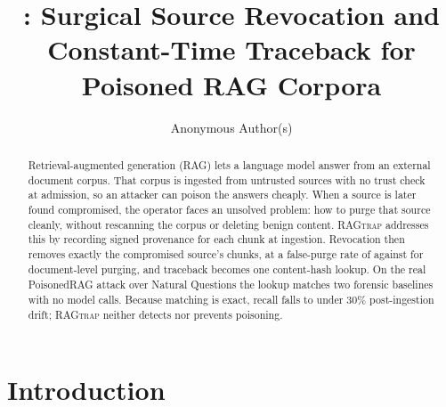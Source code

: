 \documentclass[12pt]{article}
\title{\sysname{}: Surgical Source Revocation and\\
Constant-Time Traceback for Poisoned RAG Corpora}
\author{Anonymous Author(s)\inst{1}}
\newcommand{\sysname}{\textsc{RAGtrap}\xspace}
\begin{document}
\maketitle

\begin{abstract}
Retrieval-augmented generation (RAG) lets a language model answer from an
external document corpus. That corpus is ingested from untrusted sources with no
trust check at admission, so an attacker can poison the answers cheaply. When a
source is later found compromised, the operator faces an unsolved problem: how to
purge that source cleanly, without rescanning the corpus or deleting benign
content. \sysname{} addresses this by recording signed provenance for each chunk at
ingestion. Revocation then removes exactly the compromised source's chunks, at a
false-purge rate of \textbf{\PerChunkFP{}} against \textbf{\PerDocFP{}} for
document-level purging, and traceback becomes one content-hash lookup. On the
real PoisonedRAG attack over Natural Questions the lookup matches two forensic
baselines with no model calls. Because matching is exact, recall falls to
\textbf{\RTrecallDriftThree{}} under 30\% post-ingestion drift; \sysname{}
neither detects nor prevents poisoning.
\end{abstract}

\section{Introduction}
\end{document}

